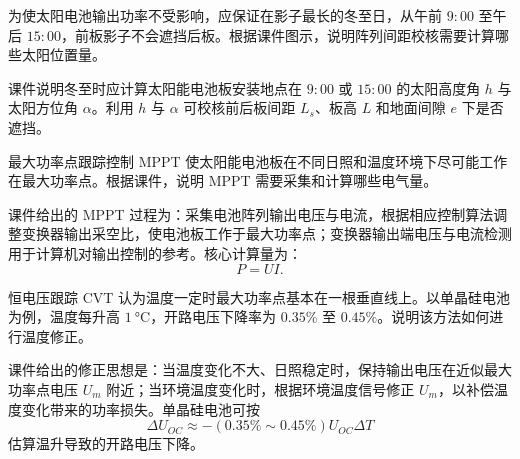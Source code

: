 \begin{problem}[固定安装阵列间距校核]\label{exer:calc_04_solar_p157_01}
为使太阳电池输出功率不受影响，应保证在影子最长的冬至日，从午前 \(9:00\) 至午后 \(15:00\)，前板影子不会遮挡后板。根据课件图示，说明阵列间距校核需要计算哪些太阳位置量。
\end{problem}

\begin{solution}
课件说明冬至时应计算太阳能电池板安装地点在 \(9:00\) 或 \(15:00\) 的太阳高度角 \(h\) 与太阳方位角 \(\alpha\)。利用 \(h\) 与 \(\alpha\) 可校核前后板间距 \(L_s\)、板高 \(L\) 和地面间隙 \(e\) 下是否遮挡。
\end{solution}

\begin{problem}[最大功率点跟踪控制]\label{exer:calc_04_solar_p169_01}
最大功率点跟踪控制 MPPT 使太阳能电池板在不同日照和温度环境下尽可能工作在最大功率点。根据课件，说明 MPPT 需要采集和计算哪些电气量。
\end{problem}

\begin{solution}
课件给出的 MPPT 过程为：采集电池阵列输出电压与电流，根据相应控制算法调整变换器输出采空比，使电池板工作于最大功率点；变换器输出端电压与电流检测用于计算机对输出控制的参考。核心计算量为：
\begin{equation}
P = UI.
\end{equation}
\end{solution}

\begin{problem}[恒电压跟踪温度修正]\label{exer:calc_04_solar_p171_01}
恒电压跟踪 CVT 认为温度一定时最大功率点基本在一根垂直线上。以单晶硅电池为例，温度每升高 \(\qty{1}{\degreeCelsius}\)，开路电压下降率为 \(0.35\%\) 至 \(0.45\%\)。说明该方法如何进行温度修正。
\end{problem}

\begin{solution}
课件给出的修正思想是：当温度变化不大、日照稳定时，保持输出电压在近似最大功率点电压 \(U_m\) 附近；当环境温度变化时，根据环境温度信号修正 \(U_m\)，以补偿温度变化带来的功率损失。单晶硅电池可按
\begin{equation}
\Delta U_{OC} \approx -(0.35\%\sim0.45\%)U_{OC}\Delta T
\end{equation}
估算温升导致的开路电压下降。
\end{solution}


